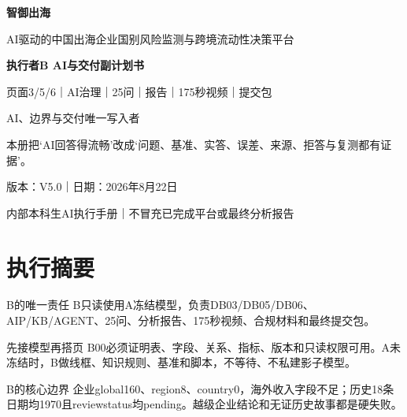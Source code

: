\documentclass[UTF8,openany,zihao=-4]{ctexbook}
\renewcommand{\_}{\textunderscore\allowbreak}
\begin{document}
\begin{titlepage}
\pagecolor{Navy}\color{white}
\centering
\vspace*{1.8cm}
{\Huge\bfseries 智御出海\par}
\vspace{0.45cm}
{\Large AI驱动的中国出海企业国别风险监测与跨境流动性决策平台\par}
\vspace{1.0cm}
{\LARGE\bfseries 执行者B AI与交付副计划书\par}
\vspace{0.55cm}
{\Large 页面3/5/6｜AI治理｜25问｜报告｜175秒视频｜提交包\par}
\vspace{0.8cm}
\begin{tcolorbox}[colback=white!7!Navy,colframe=Gold,width=.88\textwidth,boxrule=1.1pt,arc=1mm]
\centering\large AI、边界与交付唯一写入者
\end{tcolorbox}
\vfill
\begin{tcolorbox}[colback=white!9!Navy,colframe=Gold,width=.88\textwidth,boxrule=1pt,arc=1mm]
本册把‘AI回答得流畅’改成‘问题、基准、实答、误差、来源、拒答与复测都有证据’。
\end{tcolorbox}
\vfill
{\large 版本：V5.0｜日期：2026年8月22日\par}
{\large 内部本科生AI执行手册｜不冒充已完成平台或最终分析报告\par}
\end{titlepage}
\nopagecolor\color{black}
\frontmatter
\chapter*{执行摘要}
\begin{statusbox}{B的唯一责任}
B只读使用A冻结模型，负责DB03/DB05/DB06、AIP/KB/AGENT、25问、分析报告、175秒视频、合规材料和最终提交包。

\end{statusbox}
\begin{gatebox}{先接模型再搭页}
B00必须证明表、字段、关系、指标、版本和只读权限可用。A未冻结时，B做线框、知识规则、基准和脚本，不等待、不私建影子模型。

\end{gatebox}
\begin{dangerbox}{B的核心边界}
企业global160、region8、country0，海外收入字段不足；历史18条日期均1970且review\_status均pending。越级企业结论和无证历史故事都是硬失败。

\end{dangerbox}
\tableofcontents
\mainmatter
\end{document}
